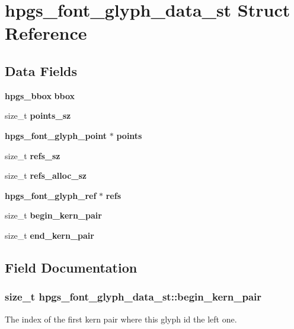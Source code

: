 \section{hpgs\_\-font\_\-glyph\_\-data\_\-st Struct Reference}
\label{structhpgs__font__glyph__data__st}
\subsection*{Data Fields}
\begin{DoxyCompactItemize}
\item 
{\bf hpgs\_\-bbox} {\bfseries bbox}\label{structhpgs__font__glyph__data__st_a3480d2fcc0eba7d618e14d6f866eadbb}

\item 
size\_\-t {\bfseries points\_\-sz}\label{structhpgs__font__glyph__data__st_aab475358c25529f4298be8f08cfad625}

\item 
{\bf hpgs\_\-font\_\-glyph\_\-point} $\ast$ {\bfseries points}\label{structhpgs__font__glyph__data__st_a056da05975e83bfc39a858c39af37661}

\item 
size\_\-t {\bfseries refs\_\-sz}\label{structhpgs__font__glyph__data__st_a56612cf8d094a281dc41be69fc70c50d}

\item 
size\_\-t {\bfseries refs\_\-alloc\_\-sz}\label{structhpgs__font__glyph__data__st_ada89536de02b7c18a4d70b0d398f1ce7}

\item 
{\bf hpgs\_\-font\_\-glyph\_\-ref} $\ast$ {\bfseries refs}\label{structhpgs__font__glyph__data__st_acd3dba6516a27c035b9d6001143bfb1d}

\item 
size\_\-t {\bf begin\_\-kern\_\-pair}
\item 
size\_\-t {\bf end\_\-kern\_\-pair}
\end{DoxyCompactItemize}


\subsection{Field Documentation}
\subsubsection[{begin\_\-kern\_\-pair}]{\setlength{\rightskip}{0pt plus 5cm}size\_\-t {\bf hpgs\_\-font\_\-glyph\_\-data\_\-st::begin\_\-kern\_\-pair}}\label{structhpgs__font__glyph__data__st_a2c907b0a6fd840f1d7ca3b7b70f6d122}
The index of the first kern pair where this glyph id the left one. 
